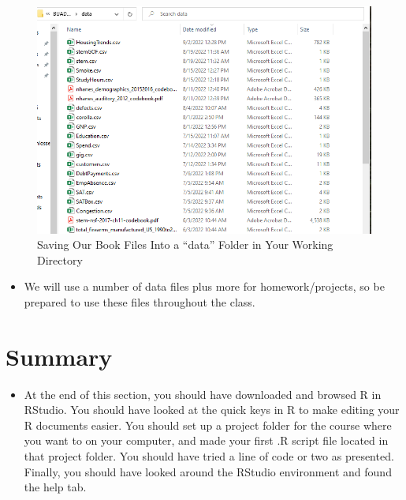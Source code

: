 \documentclass[
  letterpaper,
  DIV=11,
  numbers=noendperiod]{scrreprt}
\providecommand{\tightlist}{%
  \setlength{\itemsep}{0pt}\setlength{\parskip}{0pt}}\usepackage{longtable,booktabs,array}
\begin{document}
\begin{figure}[H]

{\centering \includegraphics{Pictures/Ch0/BookFiles.png}

}

\caption{Saving Our Book Files Into a ``data'' Folder in Your Working
Directory}

\end{figure}%

\begin{itemize}
\tightlist
\item
  We will use a number of data files plus more for homework/projects, so
  be prepared to use these files throughout the class.
\end{itemize}


\chapter{Summary}\label{summary}

\begin{itemize}
\tightlist
\item
  At the end of this section, you should have downloaded and browsed R
  in RStudio. You should have looked at the quick keys in R to make
  editing your R documents easier. You should set up a project folder
  for the course where you want to on your computer, and made your first
  .R script file located in that project folder. You should have tried a
  line of code or two as presented. Finally, you should have looked
  around the RStudio environment and found the help tab.
\end{itemize}
\end{document}

